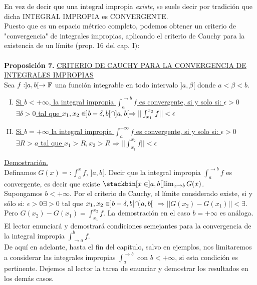 En vez de decir que una integral impropia \textit{existe}, se suele decir por tradición que dicha INTEGRAL IMPROPIA es CONVERGENTE.\\
Puesto que \F \phantom{} es un espacio métrico completo, podemos obtener un criterio de "convergencia" de integrales impropias, aplicando el criterio de Cauchy para la existencia de un límite (prop. 16 del cap. $\mathrm{I})$:\\ \\
\textbf{Proposición 7.} \underline{CRITERIO DE CAUCHY PARA LA CONVERGENCIA DE} \\
\underline{INTEGRALES IMPROPIAS}\\
Sea $f:]a,b[ \rightarrow \mathbb{F}$ una función integrable en todo intervalo $]a,\beta[$ donde $a<\beta < b$.
\begin{enumerate}[I)]
\item \underline{Si $b < +\infty$, la integral impropia $\int_a^{\to b}f$ es convergente, si y solo si: \todo $\epsilon>0$}
\underline{ $\exists \delta>0$ tal que $x_1,x_2 \in ]b-\delta,b[\cap ]a,b[\Rightarrow|| \int_{x_1}^{x_2}f||< \epsilon$}
\item \underline{Si $b=+\infty$ la integral impropia $\int_a^{+\infty}f$ es convergente, si y solo si:  \todo $\epsilon>0$}
\underline{ $\exists R>a$ tal que $x_1>R,x_2>R \Rightarrow|| \int_{x_1}^{x_2}f||< \epsilon$}
\end{enumerate}
\underline{Demostración.}\\
Definamos $G(x)=:\int_{a}^xf$, \todo \phantom{} \x \en $]a,b[$. Decir que la integral impropia $\int_a^{\to b}f$ es convergente, es decir que existe $ \stackbin[x \en ]a,b[]{}{\lim_{x\to b}G(x)}$.\\
Supongamos $b<+\infty$. Por el criterio de Cauchy, el límite considerado existe, si y sólo si: \todo $\epsilon>0 \exists>0$ tal que $x_1,x_2 \in ]b-\delta,b[ \cap ]a,b[$ $\Rightarrow || G(x_2)-G(x_1)|| < \exists$. Pero $G(x_2)-G(x_1)=\int_{x_1}^{x_2}f$. La demostración en el caso $b=+\infty$ es análoga.\\
El lector enunciará y demostrará condiciones semejantes para la convergencia de la integral impropia $\int_{\to a}^b f$.\\
De aquí en adelante, hasta el fin del capítulo, salvo en ejemplos, nos limitaremos a considerar las integrales impropias $\int_a^{\to b}$ con $b<+\infty$, si esta condición es pertinente. Dejemos al lector la tarea de enunciar y demostrar los resultados en los demás casos.\\ \\
